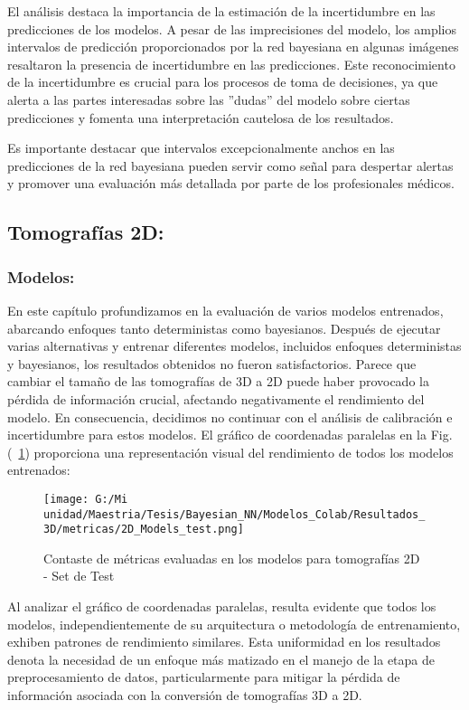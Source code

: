 \documentclass[10pt, oneside, a4paper]{article}
\begin{document}
	El análisis destaca la importancia de la estimación de la incertidumbre en las predicciones de los modelos. A pesar de las imprecisiones del modelo, los amplios intervalos de predicción proporcionados por la red bayesiana en algunas imágenes resaltaron la presencia de incertidumbre en las predicciones. Este reconocimiento de la incertidumbre es crucial para los procesos de toma de decisiones, ya que alerta a las partes interesadas sobre las ''dudas'' del modelo sobre ciertas predicciones y fomenta una interpretación cautelosa de los resultados.
	
	Es importante destacar que intervalos excepcionalmente anchos en las predicciones de la red bayesiana pueden servir como señal para despertar alertas y promover una evaluación más detallada por parte de los profesionales médicos.
	
	
	\subsection{Tomografías 2D:} \label{resultados_2d}
	
	\subsubsection{Modelos:} \label{r_modelos_2d}
	
	En este capítulo profundizamos en la evaluación de varios modelos entrenados, abarcando enfoques tanto deterministas como bayesianos. Después de ejecutar varias alternativas y entrenar diferentes modelos, incluidos enfoques deterministas y bayesianos, los resultados obtenidos no fueron satisfactorios. Parece que cambiar el tamaño de las tomografías de 3D a 2D puede haber provocado la pérdida de información crucial, afectando negativamente el rendimiento del modelo. En consecuencia, decidimos no continuar con el análisis de calibración e incertidumbre para estos modelos. El gráfico de coordenadas paralelas en la Fig.(~\ref{fig:modelos_2d}) proporciona una representación visual del rendimiento de todos los modelos entrenados:
	
	\begin{figure}[H]
	\centering
	\texttt{[image: G:/Mi unidad/Maestria/Tesis/Bayesian\_NN/Modelos\_Colab/Resultados\_3D/metricas/2D\_Models\_test.png]}
	\caption{Contaste de métricas evaluadas en los modelos para tomografías 2D - Set de Test}
	\label{fig:modelos_2d}
	\end{figure}	

	Al analizar el gráfico de coordenadas paralelas, resulta evidente que todos los modelos, independientemente de su arquitectura o metodología de entrenamiento, exhiben patrones de rendimiento similares. Esta uniformidad en los resultados denota la necesidad de un enfoque más matizado en el manejo de la etapa de preprocesamiento de datos, particularmente para mitigar la pérdida de información asociada con la conversión de tomografías 3D a 2D.
\end{document}
